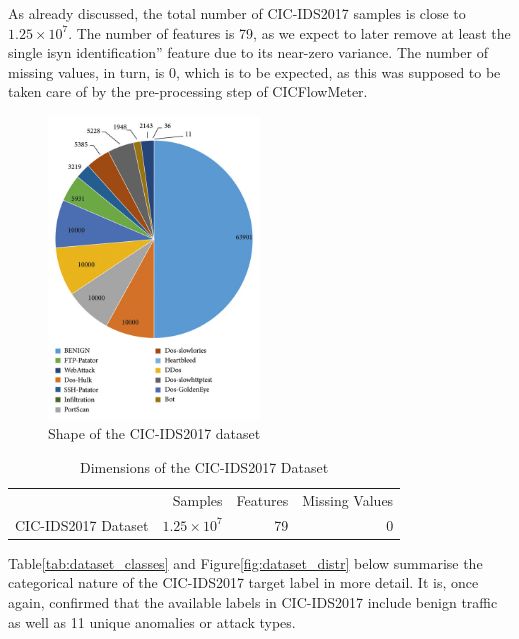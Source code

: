 As already discussed, the total number of CIC-IDS2017 samples is close to $1.25\times10^7$. The number of features is 79, as we expect to later remove at least the single isyn identification'' feature due to its near-zero variance. The number of missing values, in turn, is 0, which is to be expected, as this was supposed to be taken care of by the pre-processing step of CICFlowMeter.

\begin{figure}[H] 
\centering 
\includegraphics[width=0.5\textwidth]{assets/figures/dataset_shape.jpg} 
\caption{Shape of the CIC-IDS2017 dataset} 
\label{fig:dataset_shape} 
\end{figure} 
\parencite{articl5432e}

\begin{table}[H] 
\centering 
\caption{Dimensions of the CIC-IDS2017 Dataset}\label{tab:dataset_shape}
\begin{tabular}{lrrr} 
\toprule 
{} & Samples & Features & Missing Values \\ 
CIC-IDS2017 Dataset & $1.25\times10^7$ & 79 & 0 \\ 
\bottomrule 
\end{tabular} 
\end{table} 

Table\ref{tab:dataset_classes} and Figure\ref{fig:dataset_distr} below summarise the categorical nature of the CIC-IDS2017 target label in more detail. It is, once again, confirmed that the available labels in CIC-IDS2017 include benign traffic as well as 11 unique anomalies or attack types.

